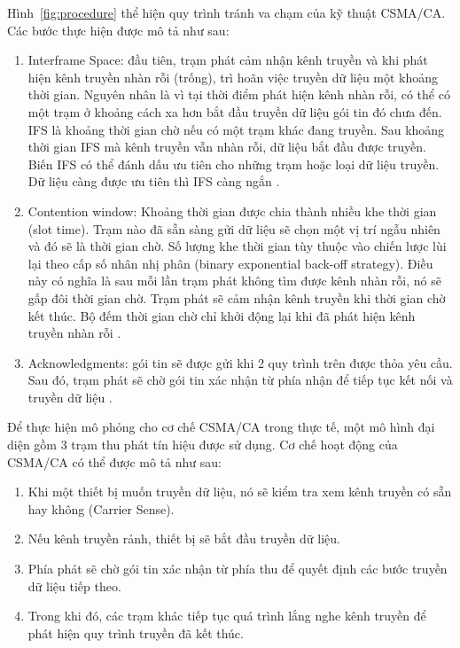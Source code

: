 Hình~\ref{fig:procedure} thể hiện quy trình tránh va chạm của kỹ thuật CSMA/CA. Các bước thực hiện được mô tả như sau:
\begin{enumerate}
    \item Interframe Space: đầu tiên, trạm phát cảm nhận kênh truyền và khi phát hiện kênh truyền nhàn rỗi (trống), trì hoãn việc truyền dữ liệu một khoảng thời gian. Nguyên nhân là vì tại thời điểm phát hiện kênh nhàn rỗi, có thể có một trạm ở khoảng cách xa hơn bắt đầu truyền dữ liệu gói tin đó chưa đến. IFS là khoảng thời gian chờ nếu có một trạm khác đang truyền. Sau khoảng thời gian IFS mà kênh truyền vẫn nhàn rỗi, dữ liệu bắt đầu được truyền. Biến IFS có thể đánh dấu ưu tiên cho những trạm hoặc loại dữ liệu truyền. Dữ liệu càng được ưu tiên thì IFS càng ngắn \cite{nam}.
    \item Contention window: Khoảng thời gian được chia thành nhiều khe thời gian (slot time). Trạm nào đã sẵn sàng gửi dữ liệu sẽ chọn một vị trí ngẫu nhiên và đó sẽ là thời gian chờ. Số lượng khe thời gian tùy thuộc vào chiến lược lùi lại theo cấp số nhân nhị phân (binary exponential back-off strategy). Điều này có nghĩa là sau mỗi lần trạm phát không tìm được kênh nhàn rỗi, nó sẽ gấp đôi thời gian chờ. Trạm phát sẽ cảm nhận kênh truyền khi thời gian chờ kết thúc. Bộ đếm thời gian chờ chỉ khởi động lại khi đã phát hiện kênh truyền nhàn rỗi \cite{nam}.
    \item Acknowledgments: gói tin sẽ được gửi khi 2 quy trình trên được thỏa yêu cầu. Sau đó, trạm phát sẽ chờ gói tin xác nhận từ phía nhận để tiếp tục kết nối và truyền dữ liệu \cite{nam}.
\end{enumerate}

Để thực hiện mô phỏng cho cơ chế CSMA/CA trong thực tế, một mô hình đại diện gồm 3 trạm thu phát tín hiệu được sử dụng. Cơ chế hoạt động của CSMA/CA có thể được mô tả như sau:
\begin{enumerate}
    \item Khi một thiết bị muốn truyền dữ liệu, nó sẽ kiểm tra xem kênh truyền có sẵn hay không (Carrier Sense).
    \item Nếu kênh truyền rảnh, thiết bị sẽ bắt đầu truyền dữ liệu.
    \item Phía phát sẽ chờ gói tin xác nhận từ phía thu để quyết định các bước truyền dữ liệu tiếp theo.
    \item Trong khi đó, các trạm khác tiếp tục quá trình lắng nghe kênh truyền để phát hiện quy trình truyền đã kết thúc.
\end{enumerate}

